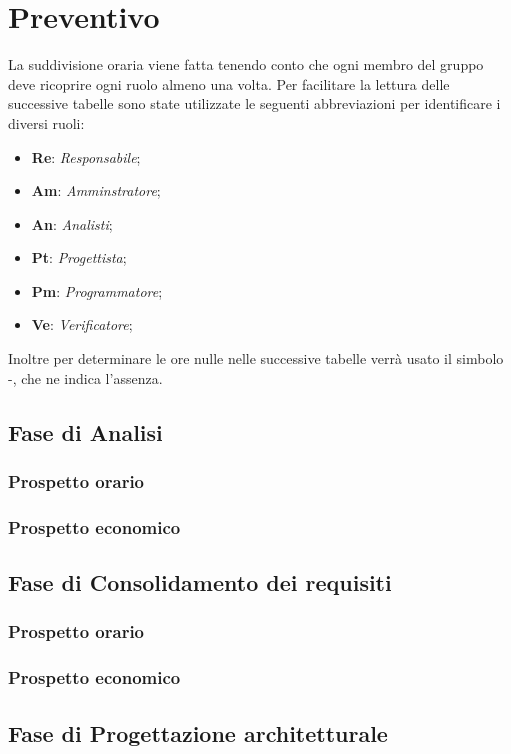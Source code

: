 \section{Preventivo}
La suddivisione oraria viene fatta tenendo conto che ogni  membro del gruppo deve ricoprire ogni ruolo almeno una volta.
Per facilitare la lettura delle successive tabelle sono state utilizzate le seguenti abbreviazioni per identificare i diversi ruoli:
\begin{itemize}
	\item \textbf{Re}: \textit{Responsabile};
	\item \textbf{Am}: \textit{Amminstratore};
	\item \textbf{An}: \textit{Analisti};
	\item \textbf{Pt}: \textit{Progettista};
	\item \textbf{Pm}: \textit{Programmatore};
	\item \textbf{Ve}: \textit{Verificatore};
\end{itemize}
Inoltre per determinare le ore nulle nelle successive tabelle verrà usato il simbolo -, che ne indica l'assenza.

\subsection{Fase di Analisi}
\subsubsection{Prospetto orario}

\subsubsection{Prospetto economico}

\subsection{Fase di Consolidamento dei requisiti}
\subsubsection{Prospetto orario}

\subsubsection{Prospetto economico}

\subsection{Fase di Progettazione architetturale}
